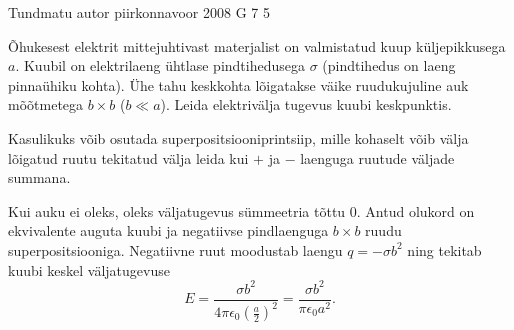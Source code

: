 {Tundmatu autor} %
{piirkonnavoor} %
{2008} %
{G 7} %
{5} %
{
\ifStatement
Õhukesest elektrit mittejuhtivast materjalist on valmistatud kuup küljepikkusega $a$. Kuubil on elektrilaeng ühtlase pindtihedusega $\sigma$ (pindtihedus on laeng pinnaühiku kohta). Ühe tahu keskkohta lõigatakse väike ruudukujuline auk mõõtmetega $b \times b$ ($b \ll a$). Leida elektrivälja tugevus kuubi keskpunktis.
\fi


\ifHint
Kasulikuks võib osutada superpositsiooniprintsiip, mille kohaselt võib välja lõigatud ruutu tekitatud välja leida kui $+$ ja $-$ laenguga ruutude väljade summana.
\fi


\ifSolution
Kui auku ei oleks, oleks väljatugevus sümmeetria tõttu 0. Antud olukord on ekvivalente auguta kuubi ja negatiivse pindlaenguga $b\times b$ ruudu superpositsiooniga. Negatiivne ruut moodustab laengu $q = -\sigma b^2$ ning tekitab kuubi keskel väljatugevuse
\[
E=\frac{\sigma b^{2}}{4\pi \epsilon_{0} \left(\frac{a}{2}\right)^{2}} = \frac{\sigma b^{2}}{\pi \epsilon_{0} a^{2}}.
\]
\fi
}